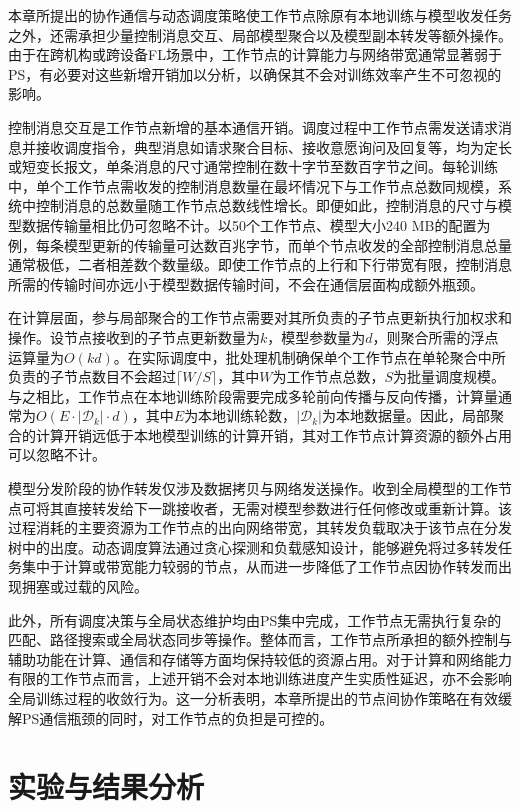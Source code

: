 \documentclass[master, vlined]{DissertUESTC}
\begin{document}
	本章所提出的协作通信与动态调度策略使工作节点除原有本地训练与模型收发任务之外，还需承担少量控制消息交互、局部模型聚合以及模型副本转发等额外操作。由于在跨机构或跨设备FL场景中，工作节点的计算能力与网络带宽通常显著弱于PS，有必要对这些新增开销加以分析，以确保其不会对训练效率产生不可忽视的影响。

	控制消息交互是工作节点新增的基本通信开销。调度过程中工作节点需发送请求消息并接收调度指令，典型消息如请求聚合目标、接收意愿询问及回复等，均为定长或短变长报文，单条消息的尺寸通常控制在数十字节至数百字节之间。每轮训练中，单个工作节点需收发的控制消息数量在最坏情况下与工作节点总数同规模，系统中控制消息的总数量随工作节点总数线性增长。即便如此，控制消息的尺寸与模型数据传输量相比仍可忽略不计。以50个工作节点、模型大小240 MB的配置为例，每条模型更新的传输量可达数百兆字节，而单个节点收发的全部控制消息总量通常极低，二者相差数个数量级。即使工作节点的上行和下行带宽有限，控制消息所需的传输时间亦远小于模型数据传输时间，不会在通信层面构成额外瓶颈。

	在计算层面，参与局部聚合的工作节点需要对其所负责的子节点更新执行加权求和操作。设节点接收到的子节点更新数量为$k$，模型参数量为$d$，则聚合所需的浮点运算量为$O(kd)$。在实际调度中，批处理机制确保单个工作节点在单轮聚合中所负责的子节点数目不会超过$\lceil W/S \rceil$，其中$W$为工作节点总数，$S$为批量调度规模。与之相比，工作节点在本地训练阶段需要完成多轮前向传播与反向传播，计算量通常为$O(E \cdot |\mathcal{D}_k| \cdot d)$，其中$E$为本地训练轮数，$|\mathcal{D}_k|$为本地数据量。因此，局部聚合的计算开销远低于本地模型训练的计算开销，其对工作节点计算资源的额外占用可以忽略不计。

	模型分发阶段的协作转发仅涉及数据拷贝与网络发送操作。收到全局模型的工作节点可将其直接转发给下一跳接收者，无需对模型参数进行任何修改或重新计算。该过程消耗的主要资源为工作节点的出向网络带宽，其转发负载取决于该节点在分发树中的出度。动态调度算法通过贪心探测和负载感知设计，能够避免将过多转发任务集中于计算或带宽能力较弱的节点，从而进一步降低了工作节点因协作转发而出现拥塞或过载的风险。

	此外，所有调度决策与全局状态维护均由PS集中完成，工作节点无需执行复杂的匹配、路径搜索或全局状态同步等操作。整体而言，工作节点所承担的额外控制与辅助功能在计算、通信和存储等方面均保持较低的资源占用。对于计算和网络能力有限的工作节点而言，上述开销不会对本地训练进度产生实质性延迟，亦不会影响全局训练过程的收敛行为。这一分析表明，本章所提出的节点间协作策略在有效缓解PS通信瓶颈的同时，对工作节点的负担是可控的。

	\section{实验与结果分析}
	\label{sec:schedule-exp}
\end{document}
